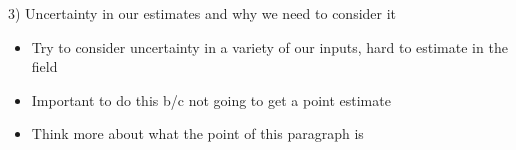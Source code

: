 \documentclass[12pt, oneside]{article}   	%
\begin{document}



3) Uncertainty in our estimates and why we need to consider it
\begin{itemize}
	\item Try to consider uncertainty in a variety of our inputs, hard to estimate in the field
	\item Important to do this b/c not going to get a point estimate
	\item Think more about what the point of this paragraph is
\end{itemize}
\end{document}
